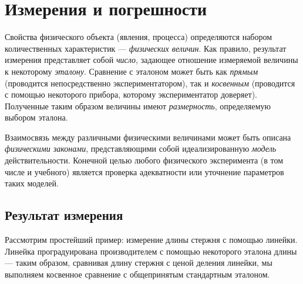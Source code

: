 \chapter{Измерения и погрешности}


Свойства физического объекта (явления, процесса) определяются набором
количественных характеристик --- \emph{физических величин}.
Как правило, результат измерения представляет
собой \emph{число}, задающее отношение измеряемой величины к некоторому \emph{эталону}.
Сравнение с эталоном может быть как
\emph{прямым} (проводится непосредственно
экспериментатором), так и \emph{косвенным} (проводится с помощью некоторого
прибора, которому экспериментатор доверяет).
Полученные таким образом величины имеют \emph{размерность}, определяемую выбором эталона.


Взаимосвязь между различными физическими величинами может быть описана
\emph{физическими законами}, представляющими собой идеализированную
\emph{модель} действительности. Конечной целью любого физического
эксперимента (в том числе и учебного) является проверка адекватности или
уточнение параметров таких моделей.

\section{Результат измерения}

Рассмотрим простейший пример: измерение длины стержня
с помощью линейки. Линейка проградуирована производителем с помощью
некоторого эталона длины --- таким образом, сравнивая длину
стержня с ценой деления линейки, мы выполняем косвенное сравнение с
общепринятым стандартным эталоном.


